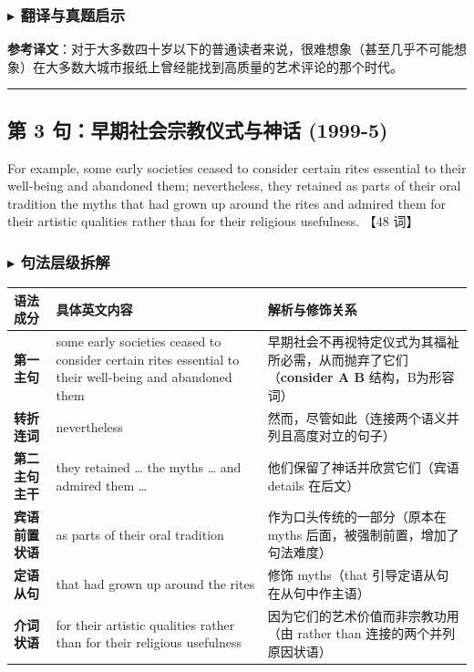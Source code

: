 \documentclass[cn,normal,11pt]{elegantnote}
\begin{document}
\subsubsection*{$\blacktriangleright$ 翻译与真题启示}
\begin{remark}
  \textbf{参考译文}：对于大多数四十岁以下的普通读者来说，很难想象（甚至几乎不可能想象）在大多数大城市报纸上曾经能找到高质量的艺术评论的那个时代。
\end{remark}

\par\vspace{10pt}\hrule\vspace{10pt}

\subsection{第 3 句：早期社会宗教仪式与神话 (1999-5)}

\begin{note}
  For example, some early societies ceased to consider certain rites essential to their well-being and abandoned them; nevertheless, they retained as parts of their oral tradition the myths that had grown up around the rites and admired them for their artistic qualities rather than for their religious usefulness. 【48 词】
\end{note}

\subsubsection*{$\blacktriangleright$ 句法层级拆解}
\noindent
\begin{tabularx}{\textwidth}{p{3.2cm} X X}
  \toprule
  \textbf{语法成分} & \textbf{具体英文内容} & \textbf{解析与修饰关系} \\
  \midrule
  \textbf{第一主句} & some early societies ceased to consider certain rites essential to their well-being and abandoned them & 早期社会不再视特定仪式为其福祉所必需，从而抛弃了它们（\textbf{consider A B} 结构，B为形容词） \\
  \midrule
  \textbf{转折连词} & nevertheless & 然而，尽管如此（连接两个语义并列且高度对立的句子） \\
  \midrule
  \textbf{第二主句主干} & they retained … the myths … and admired them … & 他们保留了神话并欣赏它们（宾语 details 在后文） \\
  \midrule
  \textbf{宾语前置状语} & as parts of their oral tradition & 作为口头传统的一部分（原本在 myths 后面，被强制前置，增加了句法难度） \\
  \midrule
  \textbf{定语从句} & that had grown up around the rites & 修饰 myths（that 引导定语从句在从句中作主语） \\
  \midrule
  \textbf{介词状语} & for their artistic qualities rather than for their religious usefulness & 因为它们的艺术价值而非宗教功用（由 rather than 连接的两个并列原因状语） \\
  \bottomrule
\end{tabularx}
\end{document}
